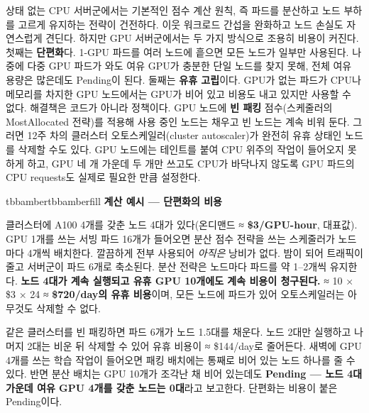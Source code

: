 상태 없는 CPU 서버군에서는 기본적인 점수 계산 원칙, 즉 파드를 분산하고 노드 부하를 고르게 유지하는 전략이 건전하다. 이웃 워크로드 간섭을 완화하고 노드 손실도 자연스럽게 견딘다. 하지만 GPU 서버군에서는 두 가지 방식으로 조용히 비용이 커진다. 첫째는 \textbf{단편화}다. 1-GPU 파드를 여러 노드에 흩으면 모든 노드가 일부만 사용된다. 나중에 다중 GPU 파드가 와도 여유 GPU가 충분한 단일 노드를 찾지 못해, 전체 여유 용량은 많은데도 Pending이 된다. 둘째는 \textbf{유휴 고립}이다. GPU가 없는 파드가 CPU나 메모리를 차지한 GPU 노드에서는 GPU가 비어 있고 비용도 내고 있지만 사용할 수 없다. 해결책은 코드가 아니라 정책이다. GPU 노드에 \textbf{빈 패킹} 점수(스케줄러의 MostAllocated 전략)를 적용해 사용 중인 노드는 채우고 빈 노드는 계속 비워 둔다. 그러면 12주 차의 클러스터 오토스케일러(cluster autoscaler)가 완전히 유휴 상태인 노드를 삭제할 수도 있다. GPU 노드에는 테인트를 붙여 CPU 위주의 작업이 들어오지 못하게 하고, GPU 네 개 가운데 두 개만 쓰고도 CPU가 바닥나지 않도록 GPU 파드의 CPU requests도 실제로 필요한 만큼 설정한다.

\begin{calloutbox}{tbbamber}{tbbamberfill}
{\normalsize\bfseries\color{tbbamberdark}계산 예시 — 단편화의 비용}\par\vspace{3pt}
클러스터에 A100 4개를 갖춘 노드 4대가 있다(온디맨드 ≈ \textbf{\$3/GPU-hour}, 대표값). GPU 1개를 쓰는 서빙 파드 16개가 들어오면 분산 점수 전략을 쓰는 스케줄러가 노드마다 4개씩 배치한다. 깔끔하게 전부 사용되어 \textit{아직은} 낭비가 없다. 밤이 되어 트래픽이 줄고 서버군이 파드 6개로 축소된다. 분산 전략은 노드마다 파드를 약 1–2개씩 유지한다. \textbf{노드 4대가 계속 실행되고 유휴 GPU 10개에도 계속 비용이 청구된다.} ≈ 10 × \$3 × 24 ≈ \textbf{\$720/day의 유휴 비용}이며, 모든 노드에 파드가 있어 오토스케일러는 아무것도 삭제할 수 없다.

같은 클러스터를 빈 패킹하면 파드 6개가 노드 1.5대를 채운다. 노드 2대만 실행하고 나머지 2대는 비운 뒤 삭제할 수 있어 유휴 비용이 ≈ \$144/day로 줄어든다. 새벽에 GPU 4개를 쓰는 학습 작업이 들어오면 패킹 배치에는 통째로 비어 있는 노드 하나를 줄 수 있다. 반면 분산 배치는 GPU 10개가 조각난 채 비어 있는데도 \textbf{Pending — 노드 4대 가운데 여유 GPU 4개를 갖춘 노드는 0대}라고 보고한다. 단편화는 비용이 붙은 Pending이다.
\end{calloutbox}

\vspace{3.0pt}

